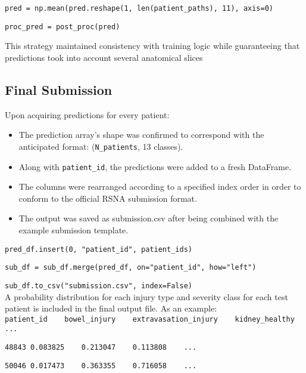 \documentclass[a4paper,12pt]{article}
\begin{document}
\verb|pred = np.mean(pred.reshape(1, len(patient_paths), 11), axis=0)|

\verb|proc_pred = post_proc(pred)|


This strategy maintained consistency with training logic while guaranteeing that predictions took into account several anatomical slices



\subsection{Final Submission}
Upon acquiring predictions for every patient:

\begin{itemize}
    \item  The prediction array's shape was confirmed to correspond with the anticipated format: (\verb|N_patients|, 13 classes).
    \item Along with \verb|patient_id|, the predictions were added to a fresh DataFrame.
     \item The columns were rearranged according to a specified index order in order to conform to the official RSNA submission format.
     \item The output was saved as submission.csv after being combined with the example submission template.
\end{itemize}


\verb|pred_df.insert(0, "patient_id", patient_ids)|

\verb|sub_df = sub_df.merge(pred_df, on="patient_id", how="left")|

\verb|sub_df.to_csv("submission.csv", index=False)|
\\

A probability distribution for each injury type and severity class for each test patient is included in the final output file. As an example:
\\

\verb|patient_id	bowel_injury	extravasation_injury	kidney_healthy	...|

\verb|48843	0.083825	0.213047	0.113808	...|


\verb|50046	0.017473	0.363355	0.716058	...|
\end{document}
